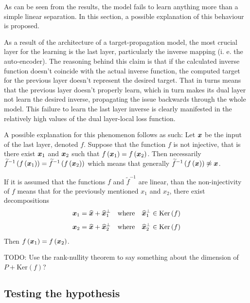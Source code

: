 As can be seen from the results, the model fails to learn anything more than a simple linear separation. In this section, a possible explanation of this behaviour is proposed.

As a result of the architecture of a target-propagation model, the most crucial layer for the learning is the last layer, particularly the inverse mapping (i. e. the auto-encoder). The reasoning behind this claim is that if the calculated inverse function doesn't coincide with the actual inverse function, the computed target for the previous layer doesn't represent the desired target. That in turns means that the previous layer doesn't properly learn, which in turn makes its dual layer not learn the desired inverse, propagating the issue backwards through the whole model. This failure to learn the last layer inverse is clearly manifested in the relatively high values of the dual layer-local loss function.

A possible explanation for this phenomenon follows as such: Let \( \bm{x} \) be the input of the last layer, denoted \( f \). Suppose that the function \( f \) is not injective, that is there exist \( \bm{x}_1 \) and \( \bm{x}_2 \) such that \( f \left( \bm{x}_1 \right) = f \left( \bm{x}_2 \right) \). Then necessarily \( \widetilde{f}^{-1} \left( f \left( \bm{x}_1 \right) \right) = \widetilde{f}^{-1} \left( f \left( \bm{x}_2 \right) \right) \) which means that generally \( \widetilde{f}^{-1} \left( f \left( \bm{x} \right) \right) \not\approx \bm{x} \).

If it is assumed that the functions \( f \) and \( \widetilde{f}^{-1} \) are linear, than the non-injectivity of \( f \) means that for the previously mentioned \( x_1 \) and \( x_2 \), there exist decompositions
\[ \bm{x}_1 = \widehat{\bm{x}} + \widehat{\bm{x}}_1^\perp \quad \text{where} \quad \widehat{\bm{x}}_1^\perp \in \mathrm{Ker} \left( f \right) \]
\[ \bm{x}_2 = \widehat{\bm{x}} + \widehat{\bm{x}}_2^\perp \quad \text{where} \quad \widehat{\bm{x}}_2^\perp \in \mathrm{Ker} \left( f \right) \]
Then \( f \left( \bm{x}_1 \right) = f \left( \bm{x}_2 \right) \).

TODO: Use the rank-nullity theorem to say something about the dimension of \( P + \mathrm{Ker} \left( f \right) \)?

\subsection{Testing the hypothesis}

